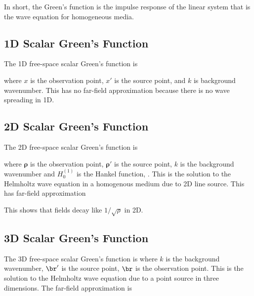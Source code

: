 In short, the Green's function is the impulse response of the linear system that is the wave equation for homogeneous media. 

\subsection{1D Scalar Green's Function}

The 1D free-space scalar Green's function is 

\noindent where $x$ is the observation point, $x'$ is the source point, and $k$ is background wavenumber. This has no far-field approximation because there is no wave spreading in 1D.   

\subsection{2D Scalar Green's Function}

The 2D free-space scalar Green's function is 

\noindent where $\boldsymbol{\rho}$ is the observation point, $\boldsymbol{\rho}'$ is the source point, $k$ is the background wavenumber and $H_0^{(1)}$ is the Hankel function, \cite{chew1995waves}. This is the solution to the Helmholtz wave equation in a homogenous medium due to 2D line source. This has far-field approximation 

This shows that fields decay like $1/\sqrt{\rho}$ in 2D. 

\subsection{3D Scalar Green's Function}

The 3D free-space scalar Green's function is 
\noindent where $k$ is the background wavenumber, $\br'$ is the source point, $\br$ is the observation point.  This is the solution to the Helmholtz wave equation due to a point source in three dimensions.  The far-field approximation is 

